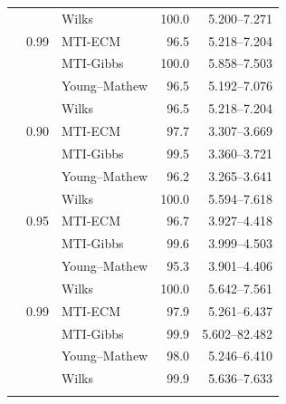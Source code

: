 \begin{longtable}{@{}rrlrr@{}}
 &  & Wilks & 100.0 & 5.200--7.271 \\
\addlinespace[0.3em]
500 & 0.99 & MTI-ECM & 96.5 & 5.218--7.204 \\
 &  & MTI-Gibbs & 100.0 & 5.858--7.503 \\
 &  & Young--Mathew & 96.5 & 5.192--7.076 \\
 &  & Wilks & 96.5 & 5.218--7.204 \\
\addlinespace[0.3em]
1000 & 0.90 & MTI-ECM & 97.7 & 3.307--3.669 \\
 &  & MTI-Gibbs & 99.5 & 3.360--3.721 \\
 &  & Young--Mathew & 96.2 & 3.265--3.641 \\
 &  & Wilks & 100.0 & 5.594--7.618 \\
\addlinespace[0.3em]
1000 & 0.95 & MTI-ECM & 96.7 & 3.927--4.418 \\
 &  & MTI-Gibbs & 99.6 & 3.999--4.503 \\
 &  & Young--Mathew & 95.3 & 3.901--4.406 \\
 &  & Wilks & 100.0 & 5.642--7.561 \\
\addlinespace[0.3em]
1000 & 0.99 & MTI-ECM & 97.9 & 5.261--6.437 \\
 &  & MTI-Gibbs & 99.9 & 5.602--82.482 \\
 &  & Young--Mathew & 98.0 & 5.246--6.410 \\
 &  & Wilks & 99.9 & 5.636--7.633 \\
\addlinespace[0.3em]
\end{longtable}
\clearpage

